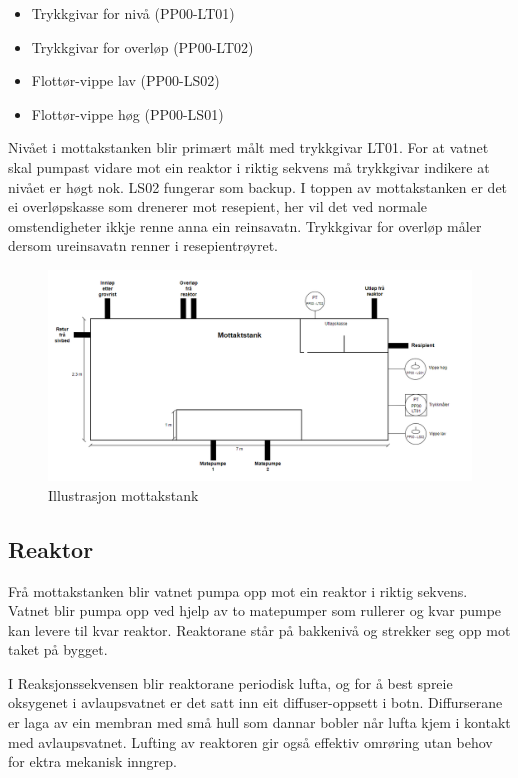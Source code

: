 \begin{itemize}
    \item Trykkgivar for nivå (PP00-LT01)
    \item Trykkgivar for overløp (PP00-LT02)
    \item Flottør-vippe lav (PP00-LS02)
    \item Flottør-vippe høg (PP00-LS01)  
\end{itemize}

Nivået i mottakstanken blir primært målt med trykkgivar LT01. For at vatnet skal pumpast vidare mot ein
reaktor i riktig sekvens må trykkgivar indikere at nivået er høgt nok. LS02 fungerar som backup.
I toppen av mottakstanken er det ei overløpskasse som drenerer mot resepient, her vil det
ved normale omstendigheter ikkje renne anna ein reinsavatn. Trykkgivar for overløp måler
dersom ureinsavatn renner i resepientrøyret.


\begin{figure}[htbp]
    \centering
    \includegraphics[width=1\textwidth]{Figurar/Mottakstank.png}
    \caption{Illustrasjon mottakstank}\label{fig:HMI}
\end{figure}

\newpage
\subsection{Reaktor}

Frå mottakstanken blir vatnet pumpa opp mot ein reaktor i riktig sekvens.
Vatnet blir pumpa opp ved hjelp av to matepumper som rullerer og kvar pumpe kan
levere til kvar reaktor. 
Reaktorane står på bakkenivå og strekker seg opp mot taket på bygget.

I Reaksjonssekvensen blir reaktorane periodisk lufta, og for å best spreie oksygenet
i avlaupsvatnet er det satt inn eit diffuser-oppsett i botn.
Diffurserane er laga av ein membran med små hull som dannar bobler når lufta kjem i 
kontakt med avlaupsvatnet.
Lufting av reaktoren gir også effektiv omrøring utan behov for ektra mekanisk inngrep.

